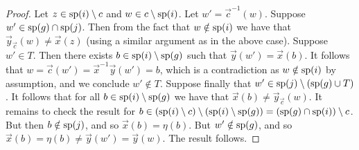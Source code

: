 \documentclass[../paper.tex]{subfiles}
\begin{document}
\begin{proof}
	Let $z \in \text{sp}(i) \setminus c$ and $w \in c \setminus \text{sp}(i)$. Let $w' =
  \vec{c}^{-1}(w)$. Suppose $w' \in \text{sp}(g) \cap \text{sp}(j)$. Then from the
  fact that $w \notin \text{sp}(i)$ we have that $\vec{y}_{\vec{c}}(w) \neq
  \vec{x}(z)$ (using a similar argument as in the above case). Suppose $w' \in
  T$. Then there exists $b \in \text{sp}(i) \setminus \text{sp}(g)$ such that
  $\vec{y}(w') = \vec{x}(b)$. It follows that $w = \vec{c}(w') =
  \vec{x}^{-1}\vec{y} (w') = b$, which is a contradiction as $w \notin
  \text{sp}(i)$ by assumption, and we conclude $w' \notin T$. Suppose finally that
  $w' \in \text{sp}(j) \setminus (\text{sp}(g) \cup T)$. It follows that for all $b
  \in \text{sp}(i) \setminus \text{sp}(g)$ we have that $\vec{x}(b) \neq
  \vec{y}_{\vec{c}}(w)$. It remains to check the result for $b \in (\text{sp}(i)
  \setminus c) \setminus (\text{sp}(i) \setminus \text{sp}(g)) = (\text{sp}(g) \cap
  \text{sp}(i)) \setminus c$. But then $b \notin \text{sp}(j)$, and so $\vec{x}(b) =
  \eta (b)$. But $w' \notin \text{sp}(g)$, and so $\vec{x}(b) = \eta(b) \neq
  \vec{y}(w') = \vec{y}(w)$. The result follows.
\end{proof}

		
\end{document}

